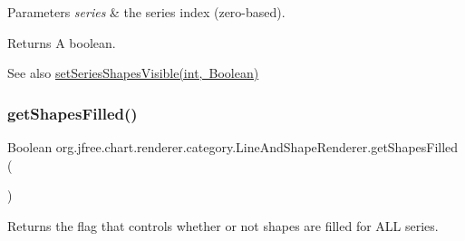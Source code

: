 \begin{DoxyParams}{Parameters}
{\em series} & the series index (zero-\/based).\\
\hline
\end{DoxyParams}
\begin{DoxyReturn}{Returns}
A boolean.
\end{DoxyReturn}
\begin{DoxySeeAlso}{See also}
\mbox{\hyperlink{classorg_1_1jfree_1_1chart_1_1renderer_1_1category_1_1_line_and_shape_renderer_a77e7ca8fcc0d5662e3430a7ea6232afb}{set\+Series\+Shapes\+Visible(int, Boolean)}} 
\end{DoxySeeAlso}
\mbox{\label{classorg_1_1jfree_1_1chart_1_1renderer_1_1category_1_1_line_and_shape_renderer_a23e8590957112ba46cca634918b3ca3d}} 
\subsubsection{\texorpdfstring{get\+Shapes\+Filled()}{getShapesFilled()}}
{\footnotesize\ttfamily Boolean org.\+jfree.\+chart.\+renderer.\+category.\+Line\+And\+Shape\+Renderer.\+get\+Shapes\+Filled (\begin{DoxyParamCaption}{ }\end{DoxyParamCaption})}

Returns the flag that controls whether or not shapes are filled for A\+LL series.

